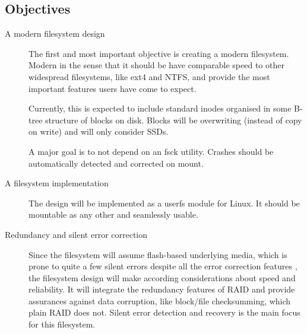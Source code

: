 \subsection{Objectives}

    \begin{description}
        \item[A modern filesystem design]

            The first and most important objective is creating a modern
            filesystem. Modern in the sense that it should be have comparable
            speed to other widespread filesystems, like ext4 and NTFS, and
            provide the most important features users have come to expect.

            Currently, this is expected to include standard inodes organised in
            some B-tree structure of blocks on disk. Blocks will be overwriting
            (instead of copy on write) and will only consider SSDs.

            A major goal is to not depend on an fsck utility. Crashes should be
            automatically detected and corrected on mount.

        \item[A filesystem implementation]

            The design will be implemented as a userfs module for Linux. It
            should be mountable as any other and seamlessly usable.

        \item[Redundancy and silent error correction]

            Since the filesystem will assume flash-based underlying media,
            which is prone to quite a few silent errors despite all the error
            correction features \cite{facebook_flash, google_flash}, the
            filesystem design will make according considerations about speed
            and reliability. It will integrate the redundancy features of RAID
            and provide assurances against data corruption, like block/file
            checksumming, which plain RAID does not. Silent error detection and
            recovery is the main focus for this filesystem.


\end{description}
